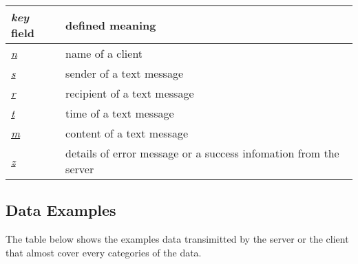 \documentclass[a4paper]{report}
\begin{document}
\begin{tabular}{|l|l|}
  \hline
  \textit{key} field & defined meaning \\
  \hline
  \underline{\textit{n}} & name of a client \\
  \hline
  \underline{\textit{s}} & sender of a text message \\
  \hline
  \underline{\textit{r}} & recipient of a text message \\
  \hline
  \underline{\textit{t}} & time of a text message \\
  \hline
  \underline{\textit{m}} & content of a text message \\
  \hline
  \underline{\textit{z}} & details of error message or a success infomation from the server \\
  \hline
\end{tabular}

\subsection*{Data Examples}
The table below shows the examples data transimitted by the server or the client that almost cover every categories of the data.
\end{document}
